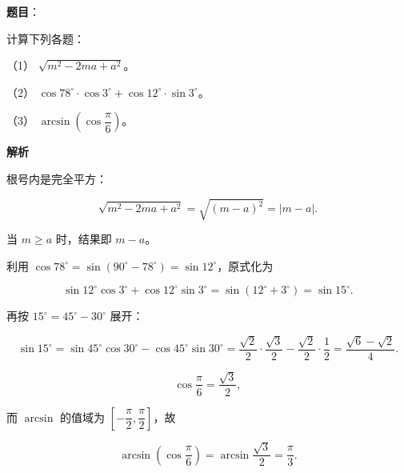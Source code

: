 \begin{answer}

\textbf{题目}：

计算下列各题：

（1） $\sqrt{m^2-2ma+a^2}$。

（2） $\cos78^\circ\cdot\cos3^\circ+\cos12^\circ\cdot\sin3^\circ$。

（3） $\arcsin\left(\cos\dfrac{\pi}{6}\right)$。

\textbf{解析}


根号内是完全平方：

\nopagebreak[4]
\[
\sqrt{m^2-2ma+a^2}=\sqrt{(m-a)^2}=|m-a|.
\]

当 $m\ge a$ 时，结果即 $m-a$。


利用 $\cos78^\circ=\sin(90^\circ-78^\circ)=\sin12^\circ$，原式化为

\nopagebreak[4]
\[
\sin12^\circ\cos3^\circ+\cos12^\circ\sin3^\circ
=\sin(12^\circ+3^\circ)=\sin15^\circ.
\]

再按 $15^\circ=45^\circ-30^\circ$ 展开：

\nopagebreak[4]
\[
\sin15^\circ
=\sin45^\circ\cos30^\circ-\cos45^\circ\sin30^\circ
=\frac{\sqrt2}{2}\cdot\frac{\sqrt3}{2}-\frac{\sqrt2}{2}\cdot\frac12
=\frac{\sqrt6-\sqrt2}{4}.
\]


\nopagebreak[4]
\[
\cos\frac{\pi}{6}=\frac{\sqrt3}{2},
\]

而 $\arcsin$ 的值域为 $\left[-\dfrac{\pi}{2},\dfrac{\pi}{2}\right]$，故

\nopagebreak[4]
\[
\arcsin\left(\cos\frac{\pi}{6}\right)=\arcsin\frac{\sqrt3}{2}=\frac{\pi}{3}.
\]




\end{answer}

